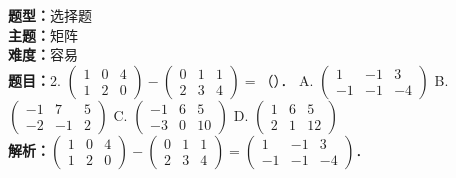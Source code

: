 \documentclass{ctexart}
\newenvironment{question}[5]{%
	\noindent\textbf{题型：}#1\\
	\textbf{主题：}#2\\
	\textbf{难度：}#3\\
	\textbf{题目：}#4\\
	\textbf{解析：}#5\\
	\vspace{1em}
}{}
\begin{document}
	\begin{question}
		{选择题}
		{矩阵}
		{容易}
		{2. \(\left(\begin{array}{lll}1 & 0 & 4 \\ 1 & 2 & 0\end{array}\right)-\left(\begin{array}{lll}0 & 1 & 1 \\ 2 & 3 & 4\end{array}\right)=\)（）．
			A. \(\left(\begin{array}{ccc}1 & -1 & 3 \\ -1 & -1 & -4\end{array}\right)\)
			B. \(\left(\begin{array}{ccc}-1 & 7 & 5 \\ -2 & -1 & 2\end{array}\right)\)
			C. \(\left(\begin{array}{ccc}-1 & 6 & 5 \\ -3 & 0 & 10\end{array}\right)\)
			D. \(\left(\begin{array}{ccc}1 & 6 & 5 \\ 2 & 1 & 12\end{array}\right)\)}
		{\(\left(\begin{array}{lll}1 & 0 & 4 \\ 1 & 2 & 0\end{array}\right)-\left(\begin{array}{lll}0 & 1 & 1 \\ 2 & 3 & 4\end{array}\right)=\left(\begin{array}{ccc}1 & -1 & 3 \\ -1 & -1 & -4\end{array}\right)\)．}
	\end{question}
	
\end{document}
